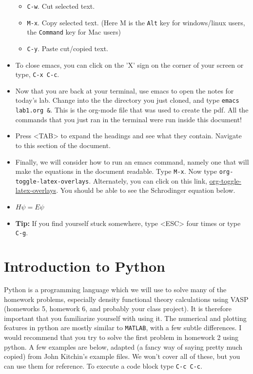 \documentclass[11pt]{article}
\begin{document}
\begin{itemize}
\begin{itemize}
\item \verb~C-w~. Cut selected text.
\item \verb~M-x~. Copy selected text. (Here M is the \texttt{Alt} key for windows/linux users, the \texttt{Command} key for Mac users)
\item \verb~C-y~. Paste cut/copied text.
\end{itemize}

\item To close emacs, you can click on the 'X' sign on the corner of your screen or type, \verb~C-x C-c~.

\item Now that you are back at your terminal, use emacs to open the notes for today's lab. Change into the the directory you just cloned, and type \verb~emacs lab1.org &~. This is the org-mode file that was used to create the pdf. All the commands that you just ran in the terminal were run inside this document!

\item Press <TAB> to expand the headings and see what they contain. Navigate to this section of the document.

\item Finally, we will consider how to run an emacs command, namely one that will make the equations in the document readable. Type \verb~M-x~. Now type \verb~org-toggle-latex-overlays~. Alternately, you can click on this link, \url{org-toggle-latex-overlays}. You should be able to see the Schrodinger equation below.

\item $H\psi = E\psi$

\item \textbf{Tip:} If you find yourself stuck somewhere, type <ESC> four times or type \verb~C-g~.
\end{itemize}


\section{Introduction to Python}
\label{sec-3}

Python is a programming language which we will use to solve many of the homework problems, especially density functional theory calculations using VASP (homeworks 5, homework 6, and probably your class project). It is therefore important that you familiarize yourself with using it. The numerical and plotting features in python are mostly similar to \texttt{MATLAB}, with a few subtle differences. I would recommend that you try to solve the first problem in homework 2 using python. A few examples are below, adapted (a fancy way of saying pretty much copied) from John Kitchin's example files. We won't cover all of these, but you can use them for reference. To execute a code block type \verb~C-c C-c~.
\end{document}
